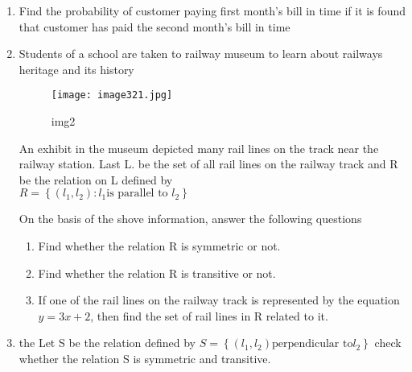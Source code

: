 \documentclass{article}
\providecommand{\cbrak}[1]{\ensuremath{\left\{#1\right\}}}
\begin{document}
\begin{enumerate}
\item Find the probability of customer paying first month's bill in time if it is found that customer has paid the second month's bill in time

\item Students of a school are taken to railway museum to learn about railways heritage and its history

\begin{figure}[h!] 
\centering  
\texttt{[image: image321.jpg]} 
\caption{img2}
\label{fig:image321}                      
\end{figure}

An exhibit in the museum depicted many rail lines on the track near the railway station. Last L. be the set of all rail lines on the railway track and R be the relation on L defined by\\
$R = \cbrak{(l_1, l_2):l_1 \text{is parallel to }l_2}$

On the basis of the shove information, answer the following questions
\begin{enumerate}
\item Find whether the relation R is symmetric or not.
\item Find whether the relation R is transitive or not.
\item If one of the rail lines on the railway track is represented by the equation $y=3x+ 2$, then find the set of rail lines in R related to it.
\end{enumerate}
\item the Let S be the relation defined by $ S = \cbrak{(l_1,l_2)\text{perpendicular to} l_2}$ check whether the relation S is symmetric and transitive.
\end{enumerate}
\end{document}
